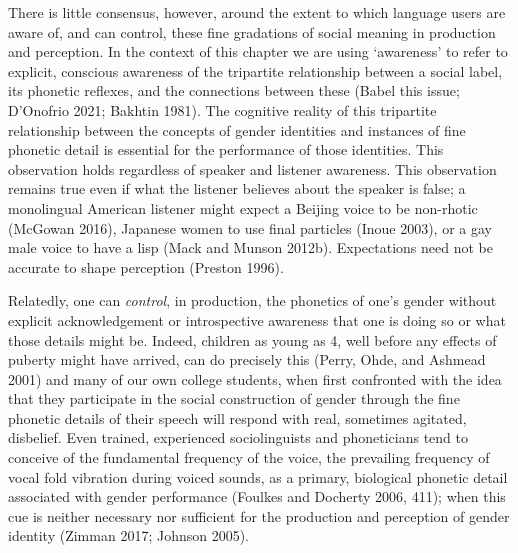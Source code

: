 \documentclass[
  letterpaper,
  DIV=11,
  numbers=noendperiod]{scrartcl}
\begin{document}
There is little consensus, however, around the extent to which language
users are aware of, and can control, these fine gradations of social
meaning in production and perception. In the context of this chapter we
are using `awareness' to refer to explicit, conscious awareness of the
tripartite relationship between a social label, its phonetic reflexes,
and the connections between these (Babel this issue; D'Onofrio 2021;
Bakhtin 1981). The cognitive reality of this tripartite relationship
between the concepts of gender identities and instances of fine phonetic
detail is essential for the performance of those identities. This
observation holds regardless of speaker and listener awareness. This
observation remains true even if what the listener believes about the
speaker is false; a monolingual American listener might expect a Beijing
voice to be non-rhotic (McGowan 2016), Japanese women to use final
particles (Inoue 2003), or a gay male voice to have a lisp (Mack and
Munson 2012b). Expectations need not be accurate to shape perception
(Preston 1996).

Relatedly, one can \emph{control}, in production, the phonetics of one's
gender without explicit acknowledgement or introspective awareness that
one is doing so or what those details might be. Indeed, children as
young as 4, well before any effects of puberty might have arrived, can
do precisely this (Perry, Ohde, and Ashmead 2001) and many of our own
college students, when first confronted with the idea that they
participate in the social construction of gender through the fine
phonetic details of their speech will respond with real, sometimes
agitated, disbelief. Even trained, experienced sociolinguists and
phoneticians tend to conceive of the fundamental frequency of the voice,
the prevailing frequency of vocal fold vibration during voiced sounds,
as a primary, biological phonetic detail associated with gender
performance (Foulkes and Docherty 2006, 411); when this cue is neither
necessary nor sufficient for the production and perception of gender
identity (Zimman 2017; Johnson 2005).
\end{document}
